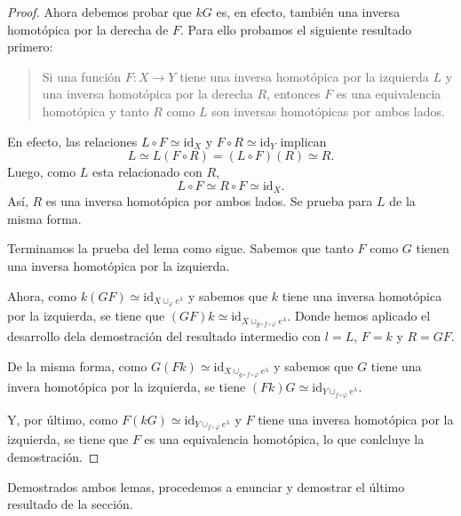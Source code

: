 \begin{proof}
    Ahora debemos probar que $kG$ es, en efecto, también una inversa homotópica por la derecha de $F$. Para ello probamos el siguiente resultado primero:
    \begin{quote}
        Si una función $F:X\to Y$ tiene una inversa homotópica por la izquierda $L$ y una inversa homotópica por la derecha $R$, entonces $F$ es una equivalencia homotópica y tanto $R$ como $L$ son inversas homotópicas por ambos lados.
    \end{quote}
    \medskip
    En efecto, las relaciones $L\circ F \simeq \text{id}_{X}$ y $F\circ R \simeq \text{id}_{Y}$ implican  
    \begin{equation*}
        L \simeq L(F\circ R) = (L\circ F)(R) \simeq R.
    \end{equation*}
    Luego, como $L$ esta relacionado con $R$,
    \begin{equation*}
        L\circ F \simeq R\circ F \simeq \text{id}_{X}.
    \end{equation*}
    Así, $R$ es una inversa homotópica por ambos lados. Se prueba para $L$ de la misma forma.

    \bigskip

    Terminamos la prueba del lema como sigue. Sabemos que tanto $F$ como $G$ tienen una inversa homotópica por la izquierda. 

    Ahora, como $k(GF)\simeq \text{id}_{X\cup_{\varphi} e^{\lambda}}$ y sabemos que $k$ tiene una inversa homotópica por la izquierda, se tiene que $(GF)k\simeq \text{id}_{X\cup_{g\circ f\circ\varphi} e^{\lambda}}$. Donde hemos aplicado el desarrollo dela demostración del resultado intermedio con $l=L$, $F=k$ y $R=GF$.

    De la misma forma, como $G(Fk) \simeq \text{id}_{X\cup_{g\circ f\circ\varphi} e^{\lambda}}$ y sabemos que $G$ tiene una invera homotópica por la izquierda, se tiene $(Fk)G \simeq \text{id}_{Y\cup_{f\circ\varphi} e^{\lambda}}$.

    Y, por último, como $F(kG) \simeq \text{id}_{Y\cup_{f\circ\varphi} e^{\lambda}}$ y $F$ tiene una inversa homotópica por la izquierda, se tiene que $F$ es una equivalencia homotópica, lo que conlcluye la demostración.

\end{proof}

Demostrados ambos lemas, procedemos a enunciar y demostrar el último resultado de la sección. 

